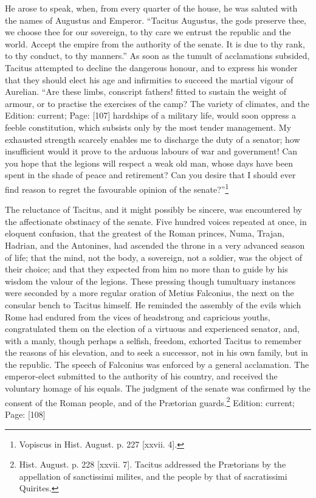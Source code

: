 He arose to speak, when, from every quarter of the house, he was saluted with the names of Augustus and Emperor. \texthebrew{“}Tacitus Augustus, the gods preserve thee, we choose thee for our sovereign, to thy care we entrust the republic and the world. Accept the empire from the authority of the senate. It is due to thy rank, to thy conduct, to thy manners.\texthebrew{}” As soon as the tumult of acclamations subsided, Tacitus attempted to decline the dangerous honour, and to express his wonder that they should elect his age and infirmities to succeed the martial vigour of Aurelian. \texthebrew{“}Are these limbs, conscript fathers! fitted to sustain the weight of armour, or to practise the exercises of the camp? The variety of climates, and the Edition: current; Page: [107] hardships of a military life, would soon oppress a feeble constitution, which subsists only by the most tender management. My exhausted strength scarcely enables me to discharge the duty of a senator; how insufficient would it prove to the arduous labours of war and government! Can you hope that the legions will respect a weak old man, whose days have been spent in the shade of peace and retirement? Can you desire that I should ever find reason to regret the favourable opinion of the senate?\texthebrew{}”\footnote{Vopiscus in Hist. August. p. 227 [xxvii. 4].}

The reluctance of Tacitus, and it might possibly be sincere, was encountered by the affectionate obstinacy of the senate. Five hundred voices repeated at once, in eloquent confusion, that the greatest of the Roman princes, Numa, Trajan, Hadrian, and the Antonines, had ascended the throne in a very advanced season of life; that the mind, not the body, a sovereign, not a soldier, was the object of their choice; and that they expected from him no more than to guide by his wisdom the valour of the legions. These pressing though tumultuary instances were seconded by a more regular oration of Metius Falconius, the next on the consular bench to Tacitus himself. He reminded the assembly of the evils which Rome had endured from the vices of headstrong and capricious youths, congratulated them on the election of a virtuous and experienced senator, and, with a manly, though perhaps a selfish, freedom, exhorted Tacitus to remember the reasons of his elevation, and to seek a successor, not in his own family, but in the republic. The speech of Falconius was enforced by a general acclamation. The emperor-elect submitted to the authority of his country, and received the voluntary homage of his equals. The judgment of the senate was confirmed by the consent of the Roman people, and of the Prætorian guards.\footnote{Hist. August. p. 228 [xxvii. 7]. Tacitus addressed the Prætorians by the appellation of sanctissimi milites, and the people by that of sacratissimi Quirites.}
Edition: current; Page: [108]

